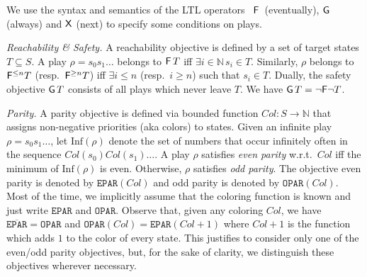 \documentclass[a4paper,UKenglish,cleveref,autoref,thm-restate]{lipics-v2021}
\newcommand{\Eparity}{\mathtt{EPAR}}
\newcommand{\Oparity}{\mathtt{OPAR}}
\newcommand{\+}[1]{\mathbb{#1}}
\newcommand{\?}[1]{\mathcal{#1}}
\newcommand{\reachset}{T}
\newcommand{\reach}[1]{\mathtt{Reach}(#1)}
\newcommand{\reachn}[2]{\mathtt{Reach}_{#1}(#2)}
\newcommand{\reachp}[1]{\mathtt{Reach}^+(#1)}
\newcommand{\always}{{\sf G}}
\newcommand{\eventually}{{\sf F}}
\renewcommand{\next}{{\sf X}}
\newcommand{\nat}{\mathbb N}
\newcommand{\states}{S}
\newcommand{\s}{s}
\newcommand{\complementof}[1]{\overline{#1}}
\newcommand{\play}{\rho}
\newcommand{\coloring}{{\mathit{C}ol}}
\begin{document}
We use the syntax and semantics of the LTL operators~\cite{CGP:book}
\mbox{$\eventually$ (eventually)}, $\always$ (always) and $\next$ (next)
to specify some conditions on plays.

\textit{Reachability \& Safety.}
A reachability objective is defined by a set of target states
$\reachset \subseteq \states$. A play $\play = \s_0s_1 \ldots$
belongs to $\eventually\,\reachset$ iff $\exists i \in \nat\, \s_i \in \reachset$.
Similarly, $\play$ belongs to $\eventually^{\le n} \reachset$
(resp.\ $\eventually^{\ge n} \reachset$) iff
$\exists i \le n$ (resp.\ $i \ge n$) such that $\s_i \in \reachset$.
Dually, the safety objective
$\always\,\reachset$ consists of all plays
which never leave $\reachset$. We have $\always\,\reachset = \neg\eventually\neg\reachset$.

\textit{Parity.} A parity objective is defined via bounded function
$\coloring: \states \to \nat$ that assigns non-negative priorities
(aka colors) to states. Given an infinite play
$\play = \s_0s_1 \ldots$, let $\text{Inf}(\play)$
denote the set of numbers that occur infinitely often in the sequence
$\coloring(\s_0)\coloring(\s_1)\ldots$.
A play $\play$ satisfies \textit{even parity}
w.r.t.\ $\coloring$ iff the minimum of $\text{Inf}(\play)$ is even.
Otherwise, $\play$ satisfies \textit{odd parity}.
The objective even parity is denoted by $\Eparity(\coloring)$
and odd parity is denoted by $\Oparity(\coloring)$.
Most of the time, we implicitly assume that the coloring function is known
and just write $\Eparity$ and $\Oparity$.
Observe that, given any coloring $\coloring$, we have
$
\complementof{\Eparity} = \Oparity$ and
$
\Oparity(\coloring) = \Eparity(\coloring + 1) 
$
where $\coloring + 1$ is the function which adds $1$ to the color of every
state. This justifies to consider only one of the even/odd parity objectives,
but, for the sake of clarity, we distinguish these objectives wherever necessary.
\end{document}
